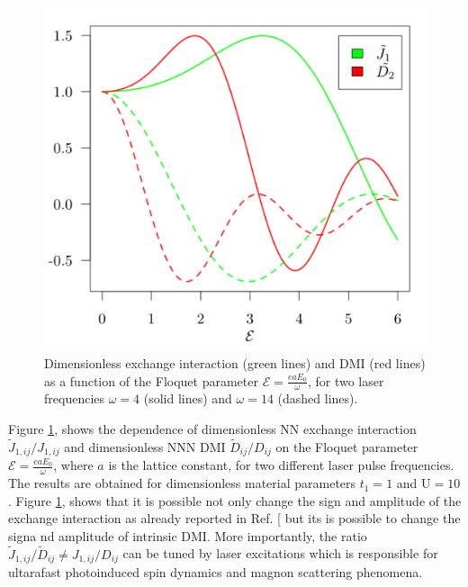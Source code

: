 \documentclass[aps,prl,twocolumn,amsmath,amssymb,nobibnotes]{revtex4-1}%
\renewcommand{\cite}[1]{{[}\onlinecite{#1}{]}}
\begin{document}
\begin{figure}[t]
\centering
\vspace{-1.3cm}
\includegraphics[width=\columnwidth]{NNvsNNN1_low_quality.pdf}
\vspace{-1cm}
\caption{Dimensionless exchange interaction (green lines) and DMI (red lines) as a function of the Floquet parameter $\mathcal{E} = \frac{eaE_0}{\omega}$, for two laser frequencies $\omega = 4$ (solid lines) and $\omega = 14$ (dashed lines).}
\label{fig2}
\end{figure}

Figure \ref{fig2}, shows the dependence of dimensionless NN exchange interaction $\tilde{J}_{1,ij}/J_{1,ij}$ and dimensionless NNN DMI $\tilde{D}_{ij}/D_{ij}$ on the Floquet parameter $\mathcal{E} = \frac{e a E_0}{\omega}$, where $a$ is the lattice constant, for two different laser pulse frequencies. The results are obtained for dimensionless material parameters $t_1=1$ and $\text{U} = 10$. Figure \ref{fig2}, shows that it is possible not only change the sign and amplitude of the exchange interaction as already reported in Ref. \cite{Mentink2015} but its is possible to change the signa nd amplitude of intrinsic DMI. More importantly, the ratio $\tilde{J}_{1,ij}/\tilde{D}_{ij}\neq J_{1,ij}/D_{ij}$ can be tuned by laser excitations which is responsible for ultarafast photoinduced spin dynamics and magnon scattering phenomena.
\end{document}
